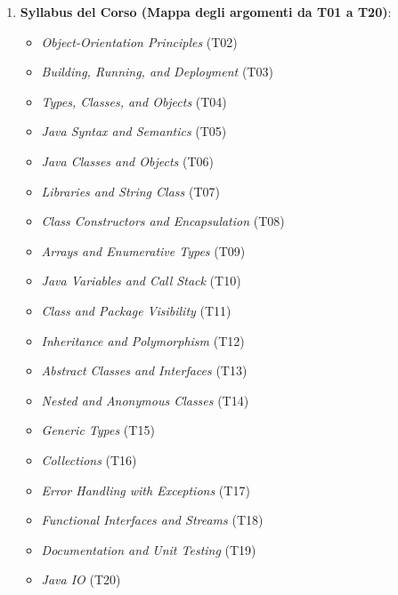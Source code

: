 \documentclass[11pt,a4paper,oneside]{report}
\providecommand{\tightlist}{\setlength{\itemsep}{0pt}\setlength{\parskip}{0pt}}
\begin{document}
\begin{enumerate}
  \begin{itemize}
  \tightlist
  \item
    \textbf{Formato}: Prova pratica al calcolatore in \textbf{Aula
    Delta} (ambiente Linux/IDE).
  \item
    \textbf{Contenuto}: Risoluzione di una serie di esercizi di
    programmazione in linguaggio Java (sviluppo classi, gerarchie a
    oggetti, implementazione interfacce, algoritmi su collezioni,
    gestione eccezioni, test con asserzioni/JUnit).
  \item
    \textbf{Voto finale}: Somma algebrica dei punti ottenuti nei singoli
    esercizi.
  \item
    È prevista una \textbf{simulazione d'esame} ufficiale a fine corso.
  \end{itemize}
\item
  \textbf{Syllabus del Corso (Mappa degli argomenti da T01 a T20)}:

  \begin{itemize}
  \tightlist
  \item
    \emph{Object-Orientation Principles} (T02)
  \item
    \emph{Building, Running, and Deployment} (T03)
  \item
    \emph{Types, Classes, and Objects} (T04)
  \item
    \emph{Java Syntax and Semantics} (T05)
  \item
    \emph{Java Classes and Objects} (T06)
  \item
    \emph{Libraries and String Class} (T07)
  \item
    \emph{Class Constructors and Encapsulation} (T08)
  \item
    \emph{Arrays and Enumerative Types} (T09)
  \item
    \emph{Java Variables and Call Stack} (T10)
  \item
    \emph{Class and Package Visibility} (T11)
  \item
    \emph{Inheritance and Polymorphism} (T12)
  \item
    \emph{Abstract Classes and Interfaces} (T13)
  \item
    \emph{Nested and Anonymous Classes} (T14)
  \item
    \emph{Generic Types} (T15)
  \item
    \emph{Collections} (T16)
  \item
    \emph{Error Handling with Exceptions} (T17)
  \item
    \emph{Functional Interfaces and Streams} (T18)
  \item
    \emph{Documentation and Unit Testing} (T19)
  \item
    \emph{Java IO} (T20)
  \end{itemize}
\end{enumerate}
\end{document}
